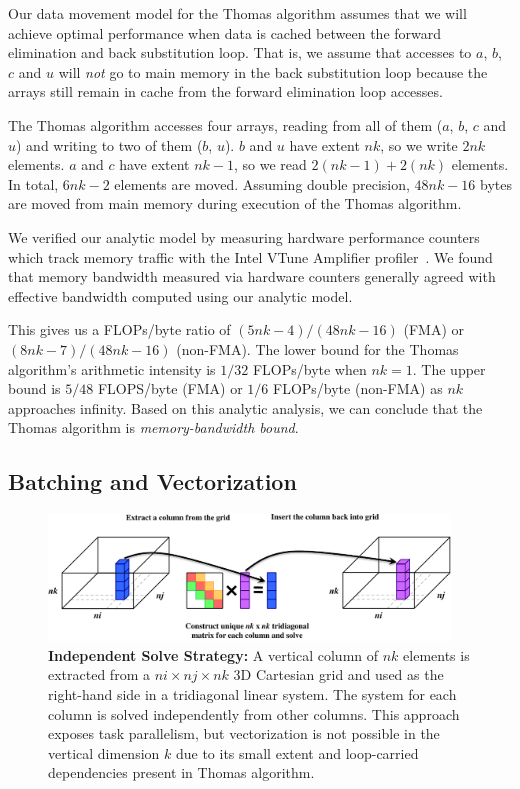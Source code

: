 \documentclass{sig-alternate-05-2015}
\begin{document}
Our data movement model for the Thomas algorithm assumes that we will achieve
  optimal performance when data is cached between the forward elimination and
  back substitution loop.
That is, we assume that accesses to \(a\), \(b\), \(c\) and \(u\) will
  \emph{not} go to main memory in the back substitution loop because the arrays
  still remain in cache from the forward elimination loop accesses.

The Thomas algorithm accesses four arrays, reading from all of them (\(a\),
  \(b\), \(c\) and \(u\)) and writing to two of them (\(b\), \(u\)).
\(b\) and \(u\) have extent \(nk\), so we write \(2nk\) elements.
\(a\) and \(c\) have extent \(nk-1\), so we read \(2(nk-1)+2(nk)\) elements.
In total, \(6nk-2\) elements are moved.
Assuming double precision, \(48nk-16\) bytes are moved from main memory
  during execution of the Thomas algorithm.

We verified our analytic model by measuring hardware performance counters which
  track memory traffic with the Intel VTune Amplifier
  profiler~\cite{intel_vtune_amplifier}.
We found that memory bandwidth measured via hardware counters generally agreed
  with effective bandwidth computed using our analytic model.

This gives us a FLOPs/byte ratio of \((5nk-4)/(48nk-16)\) (FMA) or
  \((8nk-7)/(48nk-16)\) (non-FMA).
The lower bound for the Thomas algorithm's arithmetic intensity is \(1/32\)
  FLOPs/byte when \(nk=1\). 
The upper bound is \(5/48\) FLOPS/byte (FMA) or \(1/6\) FLOPs/byte (non-FMA) as
  \(nk\) approaches infinity.
Based on this analytic analysis, we can conclude that the Thomas algorithm is
  \emph{memory-bandwidth bound}.

\subsection{Batching and Vectorization}
\label{sec:implementation:batching_and_parallelism}

\begin{figure}[!bt]
  \centering
  \label{fig:implementation:independent_solve_strategy}
  \caption{
    \textbf{Independent Solve Strategy:} A vertical column of \(nk\) elements is
      extracted from a \(ni \times nj \times nk\) 3D Cartesian grid and used as
      the right-hand side in a tridiagonal linear system.
    The system for each column is solved independently from other columns.
    This approach exposes task parallelism, but vectorization is not possible
      in the vertical dimension \(k\) due to its small extent and loop-carried
      dependencies present in Thomas algorithm.
  }
  \includegraphics[width=0.95\textwidth]{figures/independent_solve.pdf}
\end{figure}
\end{document}
